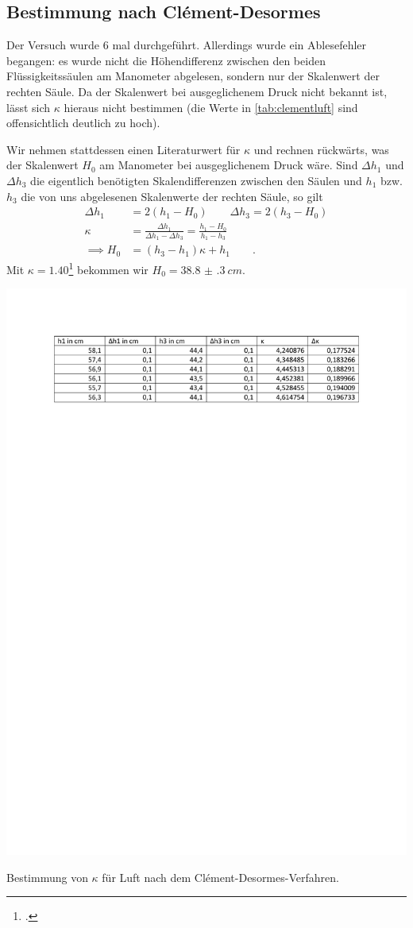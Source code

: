 \subsection{Bestimmung nach Clément-Desormes}
Der Versuch wurde 6 mal durchgeführt. Allerdings wurde ein Ablesefehler begangen: es wurde nicht die Höhendifferenz zwischen den beiden Flüssigkeitssäulen am Manometer abgelesen, sondern nur der Skalenwert der rechten Säule. Da der Skalenwert bei ausgeglichenem Druck nicht bekannt ist, lässt sich $\kappa$ hieraus nicht bestimmen (die Werte in \cref{tab:clementluft} sind offensichtlich deutlich zu hoch).

Wir nehmen stattdessen einen Literaturwert für $\kappa$ und rechnen rückwärts, was der Skalenwert $H_0$ am Manometer bei ausgeglichenem Druck wäre. Sind $\Delta h_1$ und $\Delta h_3$ die eigentlich benötigten Skalendifferenzen zwischen den Säulen und $h_1$ bzw. $h_3$ die von uns abgelesenen Skalenwerte der rechten Säule, so gilt
\begin{align}
	\Delta h_1&=2(h_1-H_0)\qquad \Delta h_3=2(h_3-H_0) \\
	\kappa&=\frac{\Delta h_1}{\Delta h_1-\Delta h_3}=\frac{h_1-H_0}{h_1-h_3}\\
	\implies H_0&=(h_3-h_1)\kappa+h_1\qquad .
\label{eq:hoehe}
\end{align}
Mit $\kappa=\num{1.40}$\footcite[][827]{white} bekommen wir $H_0=\SI{38.8(3)}{cm}$.
\begin{table}[h]
\centering
\includegraphics[width=0.6\linewidth,trim=5cm 23cm 5cm 1cm]{res/Luft2}
\caption{Bestimmung von $\kappa$ für Luft nach dem Clément-Desormes-Verfahren.}
\label{tab:clementluft}
\end{table}

